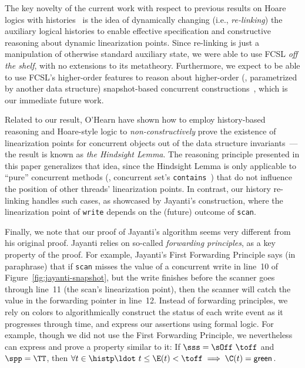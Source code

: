 The key novelty of the current work with respect to previous results
on Hoare logics with
histories~\cite{Fu-al:CONCUR10,Liang-Feng:PLDI13,Gotsman-al:ESOP13,Bell-al:SAS10,Sergey-al:ESOP15,Hemed-al:DISC15}
is the idea of dynamically changing (i.e., \emph{re-linking}) the
auxiliary logical histories to enable effective specification and
constructive reasoning about dynamic linearization points.
%
Since re-linking is just a manipulation of otherwise standard
auxiliary state, we were able to use FCSL \emph{off the shelf}, with
no extensions to its metatheory. Furthermore, we expect to be able to
use FCSL's higher-order features to reason about higher-order (\ie,
parametrized by another data structure) snapshot-based concurrent
constructions~\cite{Petrank-Timnat:DISC13}, which is our immediate
future work.
%

Related to our result, O'Hearn \etal have shown how to employ
history-based reasoning and Hoare-style logic to
\emph{non-constructively} prove the existence of linearization points
for concurrent objects out of the data structure
invariants~\cite{OHearn-al:PODC10}---the result is known as \emph{the
  Hindsight Lemma}. The reasoning principle presented in this paper
generalizes that idea, since the Hindsight Lemma is only applicable to
``pure'' concurrent methods (\eg, concurrent set's
\texttt{contains}~\cite{Heller-al:OPODIS05}) that do not influence the
position of other threads' linearization points. In contrast, our
history re-linking handles such cases, as showcased by Jayanti's
construction, where the linearization point of \texttt{write} depends
on the (future) outcome of \texttt{scan}.

Finally, we note that our proof of Jayanti's algorithm seems very
different from his original proof. Jayanti relies on
so-called \emph{forwarding principles}, as a key property of the
proof. For example, Jayanti's First Forwarding Principle says (in
paraphrase) that if {\tt scan} misses the value of a concurrent write
in line~10 of Figure~\ref{fig:jayanti-snapshot}, but the write
finishes before the scanner goes through line~11 (the scan's
linearization point), then the scanner will catch the value in the
forwarding pointer in line~12.
%
Instead of forwarding principles, we rely on colors to algorithmically
construct the status of each write event as it progresses through
time, and express our assertions using formal logic. For example, though we 
did not use the First Forwarding
Principle, we nevertheless can express and prove a property similar to
it: %
If $\sss = \sOff\ \toff$ and $\spp = \TT$, then $\forall t \in
\histp\ldot\ t \leq \E(t)< \toff \implies \C(t)= \mathsf{green}$.

